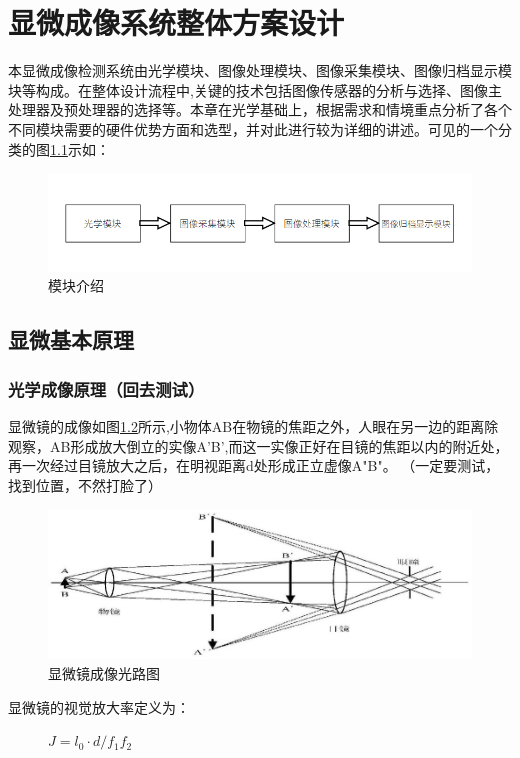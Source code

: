 \chapter{显微成像系统整体方案设计}
本显微成像检测系统由光学模块、图像处理模块、图像采集模块、图像归档显示模块等构成。在整体设计流程中,关键的技术包括图像传感器的分析与选择、图像主处理器及预处理器的选择等。本章在光学基础上，根据需求和情境重点分析了各个不同模块需要的硬件优势方面和选型，并对此进行较为详细的讲述。可见的一个分类的图\ref{fig:module_1}示如：
\begin{figure}[h]
\centering
\includegraphics[width=0.7\linewidth]{Figure/module_1}
\caption{模块介绍}
\label{fig:module_1}
\end{figure}


\section{显微基本原理}
\subsection{光学成像原理（回去测试）}

显微镜的成像如图\ref{fig:micro_1}所示,小物体AB在物镜的焦距之外，人眼在另一边的距离除观察，AB形成放大倒立的实像A'B',而这一实像正好在目镜的焦距以内的附近处，再一次经过目镜放大之后，在明视距离d处形成正立虚像A"B"\cite{lightxidian}。
（一定要测试，找到位置，不然打脸了）

\begin{figure}[h]
	\centering
	\includegraphics[width=0.7\linewidth]{Figure/micro_1}
	\caption[显微镜成像光路图]{显微镜成像光路图}
	\label{fig:micro_1}
\end{figure}

显微镜的视觉放大率定义为：

\begin{figure}[h]
\centering
\label{j2}
	$J = l_{0}\cdot d / f_{1}f_{2}$
\end{figure}

